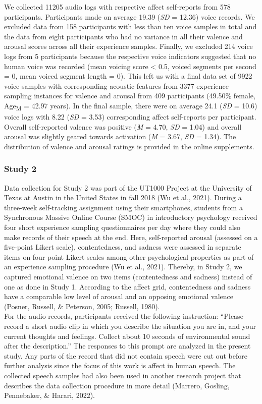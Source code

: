 \documentclass[
  english,
  man,floatsintext]{apa6}
\begin{document}
We collected 11205 audio logs with respective affect self-reports from 578 participants. Participants made on average 19.39 (\emph{SD} = 12.36) voice records. We excluded data from 158 participants with less than ten voice samples in total and the data from eight participants who had no variance in all their valence and arousal scores across all their experience samples. Finally, we excluded 214 voice logs from 5 participants because the respective voice indicators suggested that no human voice was recorded (mean voicing score \textless{} 0.5, voiced segments per second = 0, mean voiced segment length = 0).
This left us with a final data set of 9922 voice samples with corresponding acoustic features from 3377 experience sampling instances for valence and arousal from 409 participants (49.50\% female, Age\textsubscript{M} = 42.97 years). In the final sample, there were on average 24.1 (\emph{SD} = 10.6) voice logs with 8.22 (\emph{SD} = 3.53) corresponding affect self-reports per participant. Overall self-reported valence was positive (\emph{M} = 4.70, \emph{SD} = 1.04) and overall arousal was slightly geared towards activation (\emph{M} = 3.67, \emph{SD} = 1.34). The distribution of valence and arousal ratings is provided in the online supplements.

\hypertarget{study-2}{%
\subsubsection{Study 2}\label{study-2}}

Data collection for Study 2 was part of the UT1000 Project at the University of Texas at Austin in the United States in fall 2018 (Wu et al., 2021). During a three-week self-tracking assignment using their smartphones, students from a Synchronous Massive Online Course (SMOC) in introductory psychology received four short experience sampling questionnaires per day where they could also make records of their speech at the end. Here, self-reported arousal (assessed on a five-point Likert scale), contentedness, and sadness were assessed in separate items on four-point Likert scales among other psychological properties as part of an experience sampling procedure (Wu et al., 2021). Thereby, in Study 2, we captured emotional valence on two items (contentedness and sadness) instead of one as done in Study 1. According to the affect grid, contentedness and sadness have a comparable low level of arousal and an opposing emotional valence (Posner, Russell, \& Peterson, 2005; Russell, 1980).\\
For the audio records, participants received the following instruction: ``Please record a short audio clip in which you describe the situation you are in, and your current thoughts and feelings. Collect about 10 seconds of environmental sound after the description.'' The responses to this prompt are analyzed in the present study. Any parts of the record that did not contain speech were cut out before further analysis since the focus of this work is affect in human speech. The collected speech samples had also been used in another research project that describes the data collection procedure in more detail (Marrero, Gosling, Pennebaker, \& Harari, 2022).
\end{document}
